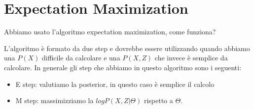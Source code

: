 \documentclass[14pt]{extreport}
\begin{document}
\section{Expectation Maximization}

Abbiamo usato l'algoritmo expectation maximization, come funziona?

L'algoritmo è formato da due step e dovrebbe essere utilizzando quando abbiamo una $P(X)$ difficile da calcolare e una $P(X,Z)$ che invece è semplice da calcolare.
In generale gli step che abbiamo in questo algoritmo sono i seguenti:

\begin{itemize}
\item E step: valutiamo la posterior, in questo caso è semplice il calcolo
\item M step: massimizziamo la $log P(X, Z | \Theta)$ rispetto a $\Theta$.
\end{itemize}
\end{document}
